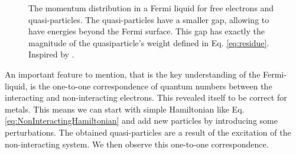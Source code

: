 \documentclass[../main.tex]{subfile}
\begin{document}
\begin{figure}[H]\centering

        \caption{The momentum distribution in a Fermi liquid for free electrons and quasi-particles. The quasi-particles have a smaller gap, allowing to have energies beyond the 
        Fermi surface. This gap has exactly the magnitude of the quasiparticle's weight defined in Eq. \ref{eq:residue}. Inspired by \cite{FossheimSudbo2004}.}
    \end{figure}

An important feature to mention, that is the key understanding of the Fermi-liquid, is the one-to-one correspondence of quantum numbers between the interacting and non-interacting electrons. 
This revealed itself to be correct for metals.
This means we can start with simple Hamiltonian like Eq. \ref{eq:NonInteractingHamiltonian} and add new particles by introducing
some perturbations. The obtained quasi-particles are a result of the excitation of the non-interacting system. We then observe this
one-to-one correspondence.\\
\end{document}
